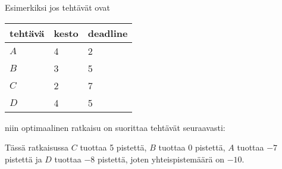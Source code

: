 Esimerkiksi jos tehtävät ovat
\begin{center}
\begin{tabular}{lll}
tehtävä & kesto & deadline \\
\hline
$A$ & 4 & 2 \\
$B$ & 3 & 5 \\
$C$ & 2 & 7 \\
$D$ & 4 & 5 \\
\end{tabular}
\end{center}
niin optimaalinen ratkaisu on suorittaa
tehtävät seuraavasti:
\begin{center}
\end{center}
Tässä ratkaisussa $C$ tuottaa 5 pistettä,
$B$ tuottaa 0 pistettä, $A$ tuottaa $-7$ pistettä
ja $D$ tuottaa $-8$ pistettä,
joten yhteispistemäärä on $-10$.

